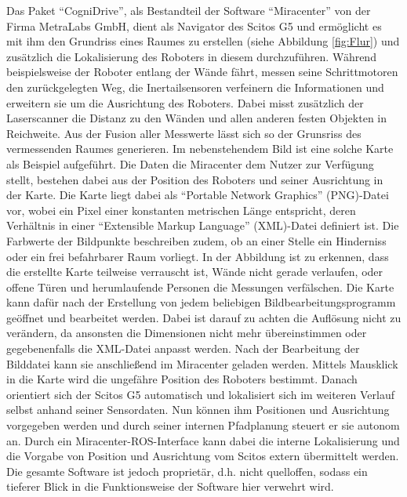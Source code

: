 Das Paket "`CogniDrive"', als Bestandteil der Software "`Miracenter"' von der Firma MetraLabs GmbH, dient als Navigator des Scitos G5 und ermöglicht es mit ihm den Grundriss eines Raumes zu erstellen (siehe Abbildung \ref{fig:Flur}) und zusätzlich die Lokalisierung des Roboters in diesem durchzuführen. Während beispielsweise der Roboter entlang der Wände fährt, messen seine Schrittmotoren den zurückgelegten Weg, die Inertailsensoren verfeinern die Informationen und erweitern sie um die Ausrichtung des Roboters. Dabei misst zusätzlich der Laserscanner die Distanz zu den Wänden und allen anderen festen Objekten in Reichweite. Aus der Fusion aller Messwerte lässt sich so der Grunsriss des vermessenden Raumes generieren. Im nebenstehendem Bild ist eine solche Karte als Beispiel aufgeführt. Die Daten die Miracenter dem Nutzer zur Verfügung stellt, bestehen dabei aus der Position des Roboters und seiner Ausrichtung in der Karte. Die Karte liegt dabei als "`Portable Network Graphics"' (PNG)-Datei vor, wobei ein Pixel einer konstanten metrischen Länge entspricht, deren Verhältnis in einer "`Extensible Markup Language"' (XML)-Datei definiert ist. Die Farbwerte der Bildpunkte beschreiben zudem, ob an einer Stelle ein Hinderniss oder ein frei befahrbarer Raum vorliegt. In der Abbildung ist zu erkennen, dass die erstellte Karte teilweise verrauscht ist, Wände nicht gerade verlaufen, oder offene Türen und herumlaufende Personen die Messungen verfälschen. Die Karte kann dafür nach der Erstellung von jedem beliebigen Bildbearbeitungsprogramm geöffnet und bearbeitet werden. Dabei ist darauf zu achten die Auflösung nicht zu verändern, da ansonsten die Dimensionen nicht mehr übereinstimmen oder gegebenenfalls die XML-Datei anpasst werden. Nach der Bearbeitung der Bilddatei kann sie anschließend im Miracenter geladen werden. Mittels Mausklick in die Karte wird die ungefähre Position des Roboters bestimmt. Danach orientiert sich der Scitos G5 automatisch und lokalisiert sich im weiteren Verlauf selbst anhand seiner Sensordaten. Nun können ihm Positionen und Ausrichtung vorgegeben werden und durch seiner internen Pfadplanung steuert er sie autonom an. Durch ein Miracenter-ROS-Interface kann dabei die interne Lokalisierung und die Vorgabe von Position und Ausrichtung vom Scitos extern übermittelt werden. Die gesamte Software ist jedoch proprietär, d.h. nicht quelloffen, sodass ein tieferer Blick in die Funktionsweise der Software hier verwehrt wird.

